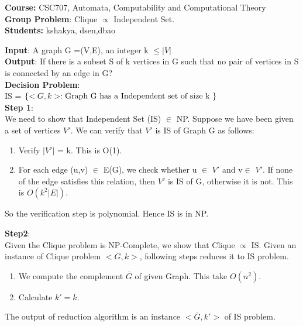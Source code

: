 \documentclass{article}%
\begin{document}
\begin{flushleft}
\textbf{Course:} CSC707, Automata, Computability and Computational Theory\\
\textbf{Group Problem}: Clique $\propto$ Independent Set. \\
\textbf{Students:} kshakya, dsen,dbao\\
\end{flushleft}


\noindent{\hrulefill}

\bigskip


\begin{flushleft}
\textbf{Input}: A graph G =(V,E), an integer k $\leq \left | V \right |$ \\
\textbf{Output}: If there is a subset S of k vertices in G such that no pair of vertices in S is connected by an edge in G?\\

\textbf{Decision Problem}: \\
IS =  $\left \{ <  G,k > : \textup{Graph G has a Independent set of size k } \right \} $\\

\textbf{Step 1}:\\
We need to show that Independent Set (IS) $ \in $ NP. Suppose we have been given a set of 
vertices $V'$. We can verify that $V'$ is IS of Graph G as follows:\\
\begin{enumerate}
	\item Verify $\left | V' \right | $ = k. This is O(1).
	\item For each edge (u,v) $\in$ E(G), we check whether u $\in$ $V'$ and v$\in$ $V'$. If none of the edge satisfies this relation, then $V'$ is IS of G, otherwise it is not. This is $O(k^2\left |E\right |)$.
\end{enumerate}

So the verification step is polynomial. Hence IS is in NP.

\textbf{Step2}:\\
Given the Clique problem is NP-Complete, we show that Clique $\propto$ IS. Given an instance of Clique problem $<G,k>$, following steps reduces it to IS problem.\\
\begin{enumerate}
\item We compute the complement $\overline{G}$ of given Graph. This take $O(n^2)$.
\item Calculate $k'=k$.
\end{enumerate}
The output of reduction algorithm is an instance $<\overline{G},k'>$ of IS problem.


\end{flushleft}
\end{document}
